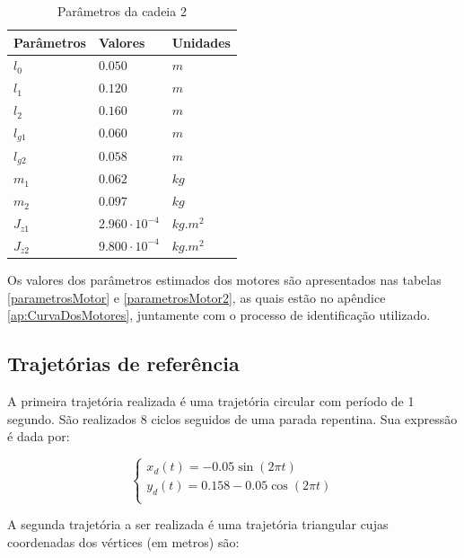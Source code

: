 \documentclass[]{politex}
\begin{document}
\begin{table}[H] 
\centering
\caption{Parâmetros da cadeia 2}
\label{tab:parametrosCadeia2}
\begin{tabular}{l|l|l}
Parâmetros   & Valores                    & Unidades   \\ \hline
$l_0$        & $0.050$                    & $m$        \\
$l_1$        & $0.120$                    & $m$        \\
$l_2$        & $0.160$                    & $m$        \\
$l_{g1}$     & $0.060$                    & $m$        \\
$l_{g2}$     & $0.058$                    & $m$        \\
$m_1$        & $0.062$                    & $kg$       \\
$m_2$        & $0.097$                    & $kg$       \\
$J_{z1}$     & $2.960   \cdot 10^{-4}$    & $kg.m^{2}$ \\
$J_{z2}$     & $9.800   \cdot 10^{-4}$    & $kg.m^{2}$ \\
\end{tabular}
\end{table}

Os valores dos parâmetros estimados dos motores são apresentados nas tabelas \ref{parametrosMotor} e \ref{parametrosMotor2}, as quais estão no apêndice \ref{ap:CurvaDosMotores}, juntamente com o processo de identificação utilizado.



\subsection{Trajetórias de referência}

A primeira trajetória realizada é uma trajetória circular com período de 1 segundo. São realizados 8 ciclos seguidos de uma parada repentina. Sua expressão é dada por:

\begin{equation}
\begin{cases}
x_d(t) = -0.05 \sin(2\pi t) \\
y_d(t) = 0.158 - 0.05 \cos(2\pi t) \\
\end{cases}
\end{equation}

A segunda trajetória a ser realizada é uma trajetória triangular cujas coordenadas dos vértices (em metros) são:
\end{document}
